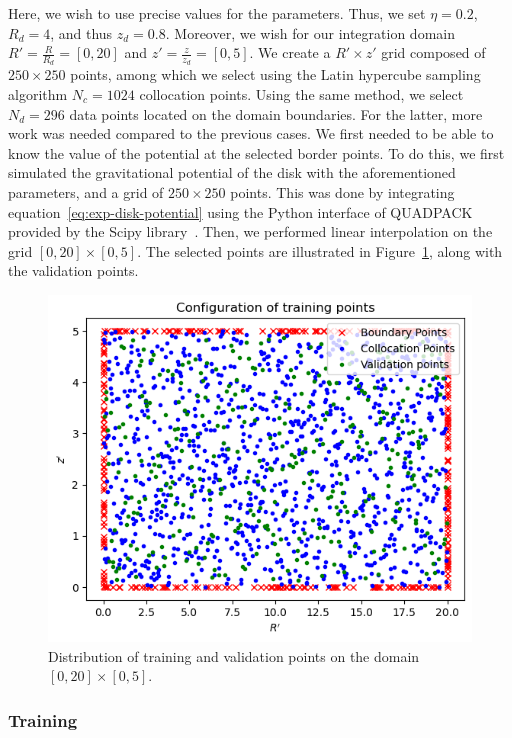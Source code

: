 Here, we wish to use precise values for the parameters. Thus, we set $\eta=0.2$, $R_d=4$, and thus $z_d=0.8$. Moreover, we wish for our integration domain $R' = \frac{R}{R_d} =[0, 20]$ and $z'= \frac{z}{z_d} =[0, 5]$. We create a $R' \times z'$ grid composed of $250 \times 250$ points, among which we select using the Latin hypercube sampling algorithm $N_c=1024$ collocation points. Using the same method, we select $N_d=296$ data points located on the domain boundaries. For the latter, more work was needed compared to the previous cases. We first needed to be able to know the value of the potential at the selected border points. To do this, we first simulated the gravitational potential of the disk with the aforementioned parameters, and a grid of $250\times250$ points. This was done by integrating equation~\eqref{eq:exp-disk-potential} using the Python interface of QUADPACK provided by the Scipy library~\cite{2020SciPy-NMeth}. Then, we performed linear interpolation on the grid $[0, 20] \times [0, 5]$. The selected points are illustrated in Figure~\ref{fig:training-points-expdisc}, along with the validation points.

\begin{figure}
\centering
\includegraphics[width=\textwidth]{imgs/training-points-expdisc.png}
\caption{Distribution of training and validation points on the domain $[0, 20] \times [0, 5]$.}
\label{fig:training-points-expdisc}
\end{figure}

\subsubsection{Training}

